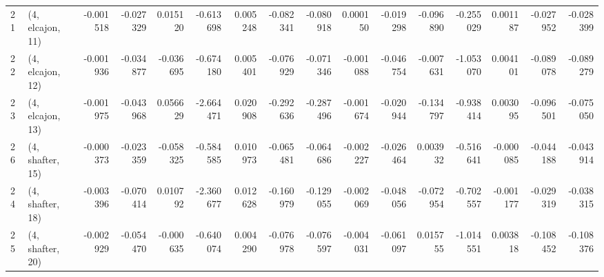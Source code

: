 \begin{tabular}{llrrrrrrrrrrrrrr}
21 &  (4, elcajon, 11) &  -0.001518 & -0.027329 &  0.015120 &  -0.613698 &  0.005248 &  -0.082341 & -0.080918 &  0.000150 & -0.019298 & -0.096890 &  -0.255029 &  0.001187 & -0.027952 & -0.028399 \\
22 &  (4, elcajon, 12) &  -0.001936 & -0.034877 & -0.036695 &  -0.674180 &  0.005401 &  -0.076929 & -0.071346 & -0.001088 & -0.046754 & -0.007631 &  -1.053070 &  0.004101 & -0.089078 & -0.089279 \\
23 &  (4, elcajon, 13) &  -0.001975 & -0.043968 &  0.056629 &  -2.664471 &  0.020908 &  -0.292636 & -0.287496 & -0.001674 & -0.020944 & -0.134797 &  -0.938414 &  0.003095 & -0.096501 & -0.075050 \\
26 &  (4, shafter, 15) &  -0.000373 & -0.023359 & -0.058325 &  -0.584585 &  0.010973 &  -0.065481 & -0.064686 & -0.002227 & -0.026464 &  0.003932 &  -0.516641 & -0.000085 & -0.044188 & -0.043914 \\
24 &  (4, shafter, 18) &  -0.003396 & -0.070414 &  0.010792 &  -2.360677 &  0.012628 &  -0.160979 & -0.129055 & -0.002069 & -0.048056 & -0.072954 &  -0.702557 & -0.001177 & -0.029319 & -0.038315 \\
25 &  (4, shafter, 20) &  -0.002929 & -0.054470 & -0.000635 &  -0.640074 &  0.004290 &  -0.076978 & -0.076597 & -0.004031 & -0.061097 &  0.015755 &  -1.014551 &  0.003818 & -0.108452 & -0.108376 \\
\bottomrule
\end{tabular}
